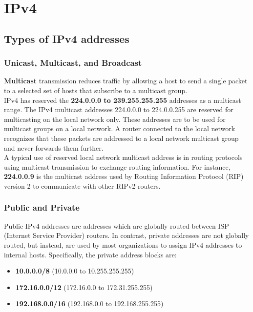 \chapter{IPv4}

\section{Types of IPv4 addresses}

\subsection{Unicast, Multicast, and Broadcast}

\textbf{Multicast} transmission reduces traffic by allowing a host to send a single packet to a selected set of hosts that subscribe to a multicast group. \\

IPv4 has reserved the \textbf{224.0.0.0 to 239.255.255.255} addresses as a multicast range. The IPv4 multicast addresses 224.0.0.0 to 224.0.0.255 are reserved for multicasting on the local network only. These addresses are to be used for multicast groups on a local network. A router connected to the local network recognizes that these packets are addressed to a local network multicast group and never forwards them further. \\

A typical use of reserved local network multicast address is in routing protocols using multicast transmission to exchange routing information. For instance, \textbf{224.0.0.9 }is the multicast address used by Routing Information Protocol (RIP) version 2 to communicate with other RIPv2 routers.

\subsection{Public and Private}

Public IPv4 addresses are addresses which are globally routed between ISP (Internet Service Provider) routers. In contrast, private addresses are not globally routed, but instead, are used by most organizations to assign IPv4 addresses to internal hosts. Specifically, the private address blocks are:

\begin{itemize}
\item \textbf{10.0.0.0/8} (10.0.0.0 to 10.255.255.255)

\item \textbf{172.16.0.0/12} (172.16.0.0 to 172.31.255.255)

\item \textbf{192.168.0.0/16} (192.168.0.0 to 192.168.255.255)
\end{itemize}

